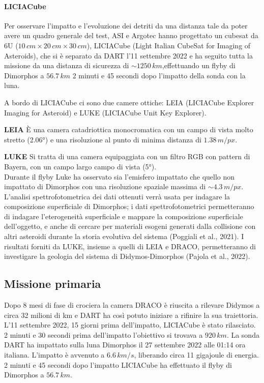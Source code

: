 \documentclass[a4paper,11pt,openright]{book}
\begin{document}
\paragraph*{LICIACube}
Per osservare l'impatto e l'evoluzione dei detriti da una distanza tale da poter avere un quadro generale del test, ASI e Argotec hanno progettato un cubesat da 6U ($10\,cm\times 20\,cm\times 30\,cm$), LICIACube (Light Italian CubeSat for Imaging of Asteroids), che si è separato da DART l'11 settembre 2022 e ha seguito tutta la missione da una distanza di sicurezza di $\sim 1250\,km$,effettuando un flyby di Dimorphos a $56.7\,km$ 2 minuti e 45 secondi dopo l'impatto della sonda con la luna.

A bordo di LICIACube ci sono due camere ottiche: LEIA (LICIACube Explorer Imaging for Asteroid) e LUKE (LICIACube Unit Key Explorer).

\qquad \small{\textbf{LEIA}} È una camera catadriottica monocromatica con un campo di vista molto stretto (2.06°) e una risoluzione al punto di minima distanza di $1.38\,m/px$.

\qquad \small{\textbf{LUKE}} Si tratta di una camera equipaggiata con un filtro RGB con pattern di Bayern, con un campo largo campo di vista (5°).\\
Durante il flyby Luke ha osservato sia l'emisfero impattato che quello non impattato di Dimorphos con una risoluzione spaziale massima di $\sim 4.3\,m/px$. L'analisi spettrofotometrica dei dati ottenuti verrà usata per indagare la composizione superficiale di Dimorphos; i dati spettrofotometrici permetteranno di indagare l'eterogeneità superficiale e mappare la composizione superficiale dell'oggetto, e anche di cercare per materiali esogeni generati dalla collisione con altri asteroidi durante la storia evolutiva del sistema (Poggiali et al., 2021). I risultati forniti da LUKE, insieme a quelli di LEIA e DRACO, permetteranno di investigare la geologia del sistema di Didymos-Dimorphos (Pajola et al., 2022).

\subsection{Missione primaria}
Dopo 8 mesi di fase di crociera la camera DRACO è riuscita a rilevare Didymos a circa 32 milioni di km e DART ha così potuto iniziare a rifinire la sua traiettoria. 
L'11 settembre 2022, 15 giorni prima dell'impatto, LICIACube è stato rilasciato. 2 minuti e 30 secondi prima dell'impatto l'obiettivo si trovava a $920\,km$. La sonda DART ha impattato sulla luna Dimorphos il 27 settembre 2022 alle 01:14 ora italiana.
L'impatto è avvenuto a $6.6\,km/s$, liberando circa 11 gigajoule di energia.
2 minuti e 45 secondi dopo l'impatto LICIACube ha effettuato il flyby di Dimorphos a $56.7\,km$.
\end{document}
